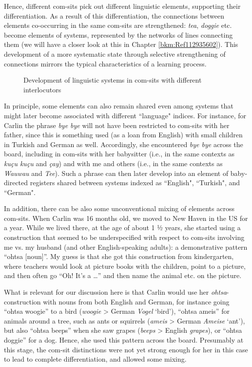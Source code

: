 Hence, different com-sits pick out different linguistic elements, supporting their differentiation. As a result of this differentiation, the connections between elements co-occurring in the same com-sits are strengthened: \textit{tea}, \textit{doggie} etc. become elements of systems, represented by the networks of lines connecting them (we will have a closer look at this in Chapter \ref{bkm:Ref112935602}). This development of a more systematic state through selective strengthening of connections mirrors the typical characteristics of a learning process.

\begin{figure}
\caption{Development of linguistic systems in com-sits with different interlocutors}
\label{fig:11}
\end{figure}

In principle, some elements can also remain shared even among systems that might later become associated with different “language" indices. For instance, for Carlin the phrase \textit{bye bye} will not have been restricted to com-sits with her father, since this is something used (as a loan from English) with small children in Turkish and German as well. Accordingly, she encountered \textit{bye bye} across the board, including in com-sits with her babysitter (i.e., in the same contexts as \textit{kuçu kuçu} and \textit{çay}) and with me and others (i.e., in the same contexts as \textit{Wauwau} and \textit{Tee}). Such a phrase can then later develop into an element of baby-directed registers shared between systems indexed as “English", “Turkish", and “German".

In addition, there can be also some unconventional mixing of elements across com-sits. When Carlin was 16 months old, we moved to New Haven in the US for a year. While we lived there, at the age of about 1 ½ years, she started using a construction that seemed to be underspecified with respect to com-sits involving me vs. my husband (and other English-speaking adults): a demonstrative pattern “ohtsa [noun]”. My guess is that she got this construction from kindergarten, where teachers would look at picture books with the children, point to a picture, and then often go “Oh! It’s a …” and then name the animal etc. on the picture.

What is relevant for our discussion here is that Carlin would use her \textit{ohtsa}{}-construction with nouns from both English and German, for instance going “oh\-tsa woogie” to a bird (\textit{woogie} > German \textit{Vogel} ‘bird’), “ohtsa ameis” for animals around a tree, such as ants or squirrels (\textit{ameis} > German \textit{Ameise} ‘ant’), but also “ohtsa beeps” when she saw grapes (\textit{beeps} > English \textit{grapes}), or “ohtsa doggie” for a dog. Hence, she used this pattern across the board. Presumably at this stage, the com-sit distinctions were not yet strong enough for her in this case to lead to complete differentiation, and allowed some mixing.

